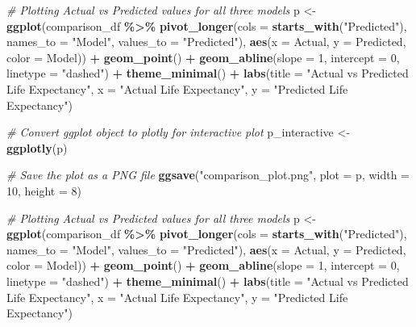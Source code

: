 \documentclass[
]{article}
\newenvironment{Shaded}{\begin{snugshade}}{\end{snugshade}}
\newcommand{\AttributeTok}[1]{\textcolor[rgb]{0.13,0.29,0.53}{#1}}
\newcommand{\CommentTok}[1]{\textcolor[rgb]{0.56,0.35,0.01}{\textit{#1}}}
\newcommand{\DecValTok}[1]{\textcolor[rgb]{0.00,0.00,0.81}{#1}}
\newcommand{\FunctionTok}[1]{\textcolor[rgb]{0.13,0.29,0.53}{\textbf{#1}}}
\newcommand{\NormalTok}[1]{#1}
\newcommand{\OtherTok}[1]{\textcolor[rgb]{0.56,0.35,0.01}{#1}}
\newcommand{\SpecialCharTok}[1]{\textcolor[rgb]{0.81,0.36,0.00}{\textbf{#1}}}
\newcommand{\StringTok}[1]{\textcolor[rgb]{0.31,0.60,0.02}{#1}}
\begin{document}
\begin{Shaded}
\begin{Highlighting}[]
\CommentTok{\# Plotting Actual vs Predicted values for all three models}
\NormalTok{p }\OtherTok{\textless{}{-}} \FunctionTok{ggplot}\NormalTok{(comparison\_df }\SpecialCharTok{\%\textgreater{}\%}
              \FunctionTok{pivot\_longer}\NormalTok{(}\AttributeTok{cols =} \FunctionTok{starts\_with}\NormalTok{(}\StringTok{"Predicted"}\NormalTok{), }\AttributeTok{names\_to =} \StringTok{"Model"}\NormalTok{, }\AttributeTok{values\_to =} \StringTok{"Predicted"}\NormalTok{),}
            \FunctionTok{aes}\NormalTok{(}\AttributeTok{x =}\NormalTok{ Actual, }\AttributeTok{y =}\NormalTok{ Predicted, }\AttributeTok{color =}\NormalTok{ Model)) }\SpecialCharTok{+}
  \FunctionTok{geom\_point}\NormalTok{() }\SpecialCharTok{+}
  \FunctionTok{geom\_abline}\NormalTok{(}\AttributeTok{slope =} \DecValTok{1}\NormalTok{, }\AttributeTok{intercept =} \DecValTok{0}\NormalTok{, }\AttributeTok{linetype =} \StringTok{"dashed"}\NormalTok{) }\SpecialCharTok{+}
  \FunctionTok{theme\_minimal}\NormalTok{() }\SpecialCharTok{+}
  \FunctionTok{labs}\NormalTok{(}\AttributeTok{title =} \StringTok{"Actual vs Predicted Life Expectancy"}\NormalTok{,}
       \AttributeTok{x =} \StringTok{"Actual Life Expectancy"}\NormalTok{,}
       \AttributeTok{y =} \StringTok{"Predicted Life Expectancy"}\NormalTok{)}

\CommentTok{\# Convert ggplot object to plotly for interactive plot}
\NormalTok{p\_interactive }\OtherTok{\textless{}{-}} \FunctionTok{ggplotly}\NormalTok{(p)}

\CommentTok{\# Save the plot as a PNG file}
\FunctionTok{ggsave}\NormalTok{(}\StringTok{"comparison\_plot.png"}\NormalTok{, }\AttributeTok{plot =}\NormalTok{ p, }\AttributeTok{width =} \DecValTok{10}\NormalTok{, }\AttributeTok{height =} \DecValTok{8}\NormalTok{)}


\CommentTok{\# Plotting Actual vs Predicted values for all three models}
\NormalTok{p }\OtherTok{\textless{}{-}} \FunctionTok{ggplot}\NormalTok{(comparison\_df }\SpecialCharTok{\%\textgreater{}\%}
              \FunctionTok{pivot\_longer}\NormalTok{(}\AttributeTok{cols =} \FunctionTok{starts\_with}\NormalTok{(}\StringTok{"Predicted"}\NormalTok{), }\AttributeTok{names\_to =} \StringTok{"Model"}\NormalTok{, }\AttributeTok{values\_to =} \StringTok{"Predicted"}\NormalTok{),}
            \FunctionTok{aes}\NormalTok{(}\AttributeTok{x =}\NormalTok{ Actual, }\AttributeTok{y =}\NormalTok{ Predicted, }\AttributeTok{color =}\NormalTok{ Model)) }\SpecialCharTok{+}
  \FunctionTok{geom\_point}\NormalTok{() }\SpecialCharTok{+}
  \FunctionTok{geom\_abline}\NormalTok{(}\AttributeTok{slope =} \DecValTok{1}\NormalTok{, }\AttributeTok{intercept =} \DecValTok{0}\NormalTok{, }\AttributeTok{linetype =} \StringTok{"dashed"}\NormalTok{) }\SpecialCharTok{+}
  \FunctionTok{theme\_minimal}\NormalTok{() }\SpecialCharTok{+}
  \FunctionTok{labs}\NormalTok{(}\AttributeTok{title =} \StringTok{"Actual vs Predicted Life Expectancy"}\NormalTok{,}
       \AttributeTok{x =} \StringTok{"Actual Life Expectancy"}\NormalTok{,}
       \AttributeTok{y =} \StringTok{"Predicted Life Expectancy"}\NormalTok{)}


\end{Highlighting}
\end{Shaded}
\end{document}
